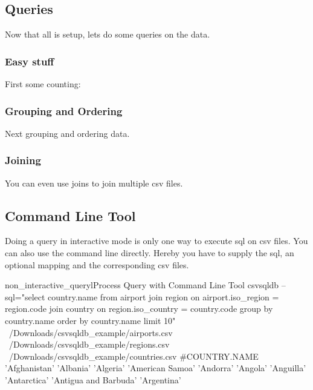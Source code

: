 \subsection{Queries}
Now that all is setup, lets do some queries on the data.

\subsubsection{Easy stuff}
First some counting:


\subsubsection{Grouping and Ordering}
Next grouping and ordering data.


\subsubsection{Joining}
You can even use joins to join multiple csv files.


\subsection{Command Line Tool}

Doing a query in interactive mode is only one way to execute sql on csv files. You can also use the command line directly. Hereby you have to supply the sql, an optional mapping and the corresponding csv files.

\begin{ShellListing}{non_interactive_queryl}{Process Query with Command Line Tool}
csvsqldb --sql="select country.name from airport join region on airport.iso_region = region.code join country on region.iso_country = country.code group by country.name order by country.name limit 10" ~/Downloads/csvsqldb_example/airports.csv ~/Downloads/csvsqldb_example/regions.csv ~/Downloads/csvsqldb_example/countries.csv
#COUNTRY.NAME
'Afghanistan'
'Albania'
'Algeria'
'American Samoa'
'Andorra'
'Angola'
'Anguilla'
'Antarctica'
'Antigua and Barbuda'
'Argentina'
\end{ShellListing}

